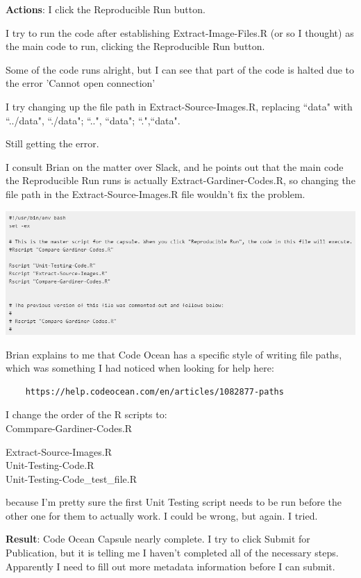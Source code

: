 \documentclass{article}
\begin{document}
\textbf{Actions}: I click the Reproducible Run button.

{\item I try to run the code after establishing Extract-Image-Files.R (or so I thought) as the main code to run, clicking the Reproducible Run button.
\item Some of the code runs alright, but I can see that part of the code is halted due to the error 'Cannot open connection'
\item I try changing up the file path in Extract-Source-Images.R, replacing ``data" with ``../data", ``./data"; ``..", ``data"; ``.",``data". 
\item Still getting the error.
\item I consult Brian on the matter over Slack, and he points out that the main code the Reproducible Run runs is actually Extract-Gardiner-Codes.R, so changing the file path in the Extract-Source-Images.R file wouldn't fix the problem.}

\includegraphics[width=1.0\textwidth]{rstudio_55.PNG}

Brian explains to me that Code Ocean has a specific style of writing file paths, which was something I had noticed when looking for help here:

\begin{verbatim}
    https://help.codeocean.com/en/articles/1082877-paths
\end{verbatim}

I change the order of the R scripts to:
\\Commpare-Gardiner-Codes.R

Extract-Source-Images.R
\\Unit-Testing-Code.R
\\Unit-Testing-Code\_test\_file.R

because I'm pretty sure the first Unit Testing script needs to be run before the other one for them to actually work. I could be wrong, but again. I tried.

\textbf{Result}: Code Ocean Capsule nearly complete. I try to click Submit for Publication, but it is telling me I haven't completed all of the necessary steps. Apparently I need to fill out more metadata information before I can submit.
\end{document}
